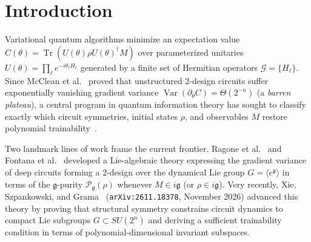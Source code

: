 \documentclass[11pt,a4paper]{article}
\theoremstyle{definition}
\theoremstyle{remark}
\newcommand{\Tr}{\operatorname{Tr}}
\newcommand{\Var}{\operatorname{Var}}
\newcommand{\lieg}{\mathfrak{g}}
\begin{document}
\begin{abstract}
circuits up to $n=100$ qubits in $< 1$\,ms with zero quantum shots (versus $9.49\times 10^{24}$ finite-shot Chebyshev evaluations at $n=40$) while rejecting $49/49$ live adversarial attacks.
\end{abstract}

\section{Introduction}

Variational quantum algorithms minimize an expectation value $C(\theta) = \Tr(U(\theta)\rho U(\theta)^\dagger M)$ over parameterized unitaries $U(\theta) = \prod_\ell e^{-i\theta_\ell H_\ell}$ generated by a finite set of Hermitian operators $\mathcal{G} = \{H_\ell\}$. Since McClean et al.~\cite{mcclean2018barren} proved that unstructured $2$-design circuits suffer exponentially vanishing gradient variance $\Var(\partial_\theta C) = \Theta(2^{-n})$ (a \emph{barren plateau}), a central program in quantum information theory has sought to classify exactly which circuit symmetries, initial states $\rho$, and observables $M$ restore polynomial trainability~\cite{cerezo2021cost,larocca2022diagnosing,diaz2023showcasing,wiersema2024classification}.

Two landmark lines of work frame the current frontier. Ragone et al.~\cite{ragone2024lie} and Fontana et al.~\cite{fontana2024characterizing} developed a Lie-algebraic theory expressing the gradient variance of deep circuits forming a $2$-design over the dynamical Lie group $G = \langle e^{\lieg}\rangle$ in terms of the $\lieg$-purity $\mathcal{P}_{\lieg}(\rho)$ whenever $M \in i\lieg$ (or $\rho \in i\lieg$). Very recently, Xie, Szpankowski, and Grama~\cite{xie2026structure} (\texttt{arXiv:2611.18378}, November 2026) advanced this theory by proving that structural symmetry constrains circuit dynamics to compact Lie subgroups $G \subset SU(2^n)$ and deriving a sufficient trainability condition in terms of polynomial-dimensional invariant subspaces.
\end{document}
